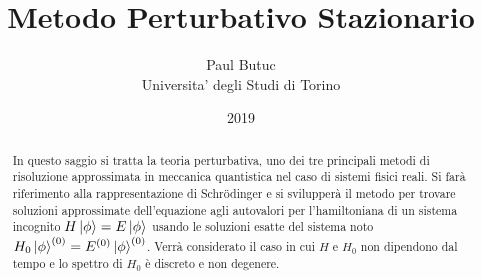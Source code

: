 \documentclass[a4paper, 10pt]{article}
\title{\textbf{Metodo Perturbativo Stazionario}}
\author{Paul Butuc \\ Universita' degli Studi di Torino}
\date{2019}
\begin{document}
\maketitle
\vfil

\begin{abstract}
In questo saggio si tratta la teoria perturbativa, uno dei tre principali metodi di risoluzione approssimata in meccanica quantistica nel caso di sistemi fisici reali. Si farà riferimento alla rappresentazione di Schr\"odinger e si svilupperà il metodo per trovare soluzioni approssimate dell'equazione agli autovalori per l'hamiltoniana di un sistema incognito $H\ket{\phi} = E\ket{\phi}$ usando le soluzioni esatte del sistema noto $H_0\ket{\phi}^{(0)} = E^{(0)}\ket{\phi}^{(0)}$. Verrà considerato il caso in cui $H$ e $H_0$ non dipendono dal tempo e lo spettro di $H_0$ è discreto e non degenere.
\end{abstract}
\newpage
{}


\end{document}
